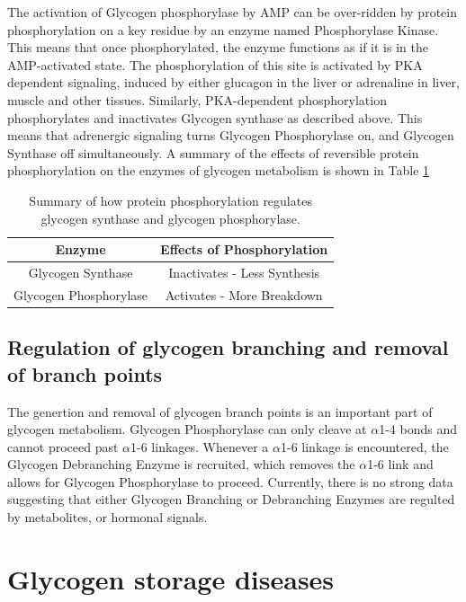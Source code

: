 \documentclass{tufte-handout}
\begin{document}
The activation of Glycogen phosphorylase by AMP can be over-ridden by protein phosphorylation on a key residue by an enzyme named Phosphorylase Kinase.  This means that once phosphorylated, the enzyme functions as if it is in the AMP-activated state.  The phosphorylation of this site is activated by PKA dependent signaling, induced by either glucagon in the liver or adrenaline in liver, muscle and other tissues.  Similarly, PKA-dependent phosphorylation phosphorylates and inactivates Glycogen synthase as described above.  This means that adrenergic signaling turns Glycogen Phosphorylase on, and Glycogen Synthase off simultaneously.  A summary of the effects of reversible protein phosphorylation on the enzymes of glycogen metabolism is shown in Table \ref{tab:gs-gp-phosphorylation}

\begin{table}
\centering
\caption{Summary of how protein phosphorylation regulates glycogen synthase and glycogen phosphorylase.}
\label{tab:gs-gp-phosphorylation}
\begin{tabular}{cc}
\hline
\textbf {Enzyme} & \textbf{Effects of Phosphorylation}  \\
\hline
Glycogen Synthase & Inactivates - Less Synthesis \\
Glycogen Phosphorylase & Activates - More Breakdown\\
\hline
\end{tabular}
\end{table}

\subsection{Regulation of glycogen branching and removal of branch points}

The genertion and removal of glycogen branch points is an important part of glycogen metabolism.  Glycogen Phosphorylase can only cleave at $\alpha$1-4 bonds and cannot proceed past $\alpha$1-6 linkages.  Whenever a $\alpha$1-6 linkage is encountered, the Glycogen Debranching Enzyme is recruited, which removes the $\alpha$1-6 link and allows for Glycogen Phosphorylase to proceed.  Currently, there is no strong data suggesting that either Glycogen Branching or Debranching Enzymes are regulted by metabolites, or hormonal signals.

\section{Glycogen storage diseases}
\end{document}
